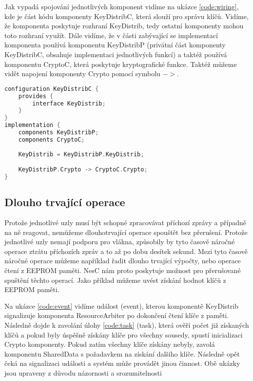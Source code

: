 \documentclass[11pt,final,twoside]{fithesis2}
\begin{document}
Jak vypadá spojování jednotlivých komponent vidíme na ukázce \ref{code:wiring}, kde je část kódu komponenty KeyDistribC, která slouží pro správu klíčů. Vidíme, že komponenta poskytuje rozhraní 
KeyDistrib, tedy ostatní komponenty mohou toto rozhraní využít. Dále vidíme, že v části zabývající se implementací komponenta používá komponentu KeyDistribP (privátní část komponenty KeyDistribC, obsahuje 
implementaci jednotlivých funkcí) a taktéž používá komponentu CryptoC, která poskytuje kryptografické funkce. Taktéž můžeme vidět napojení komponenty Crypto pomocí symbolu $->$.

\begin{lstlisting}[float, language=C,caption=Ukázka propojení komponent,label=code:wiring]
configuration KeyDistribC {
	provides {
		interface KeyDistrib;
	}
}
implementation {
	components KeyDistribP;  
	components CryptoC;
		
	KeyDistrib = KeyDistribP.KeyDistrib;

	KeyDistribP.Crypto -> CryptoC.Crypto;	
}
\end{lstlisting}



\subsection{Dlouho trvající operace} \label{sub:long}
Protože jednotlivé uzly musí být schopné zpracovávat příchozí zprávy a případně na ně reagovat, nemůžeme dlouhotrvající operace spouštět bez přerušení. Protože jednotlivé uzly nemají podporu pro vlákna, 
způsobily by tyto časově náročné operace ztrátu příchozích zpráv a to až po dobu desítek sekund. Mezi tyto časově náročné operace můžeme například řadit dlouho trvající výpočty, nebo operace čtení z EEPROM 
paměti. NesC nám proto poskytuje možnost pro přerušované spuštění těchto operací. Jako příklad můžeme uvést získání hodnot klíčů z EEPROM paměti. \cite{Levis2009}

Na ukázce \ref{code:event} vidíme událost (event), kterou 
komponentě KeyDistrib signalizuje komponenta ResourceArbiter po dokončení čtení klíče z paměti. Následně dojde k zavolání úlohy \ref{code:task} (task), která ověří počet již získaných klíčů a pokud byly 
úspěšně získány klíče pro všechny sousedy, spustí inicializaci Crypto komponenty. Pokud zatím všechny klíče získány nebyly, zavolá komponentu SharedData s požadavkem na získání dalšího klíče. Následně opět 
čeká na signalizaci události a systém může provádět jinou činnost. Obě ukázky jsou upraveny z důvodu názornosti a srozumitelnosti
\end{document}

